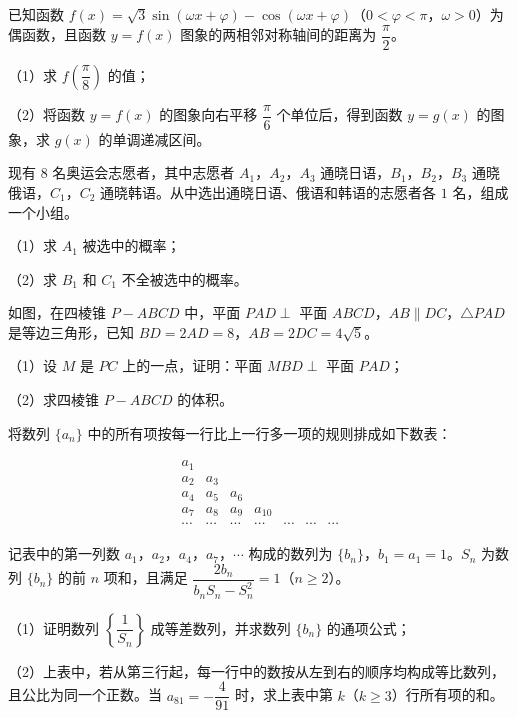 \begin{question}
已知函数 $f(x)=\sqrt3\sin(\omega x+\varphi)-\cos(\omega x+\varphi)$（$0<\varphi<\pi$，$\omega>0$）为偶函数，且函数 $y=f(x)$ 图象的两相邻对称轴间的距离为 $\dfrac{\pi}{2}$。

（1）求 $f\left(\dfrac{\pi}{8}\right)$ 的值；

（2）将函数 $y=f(x)$ 的图象向右平移 $\dfrac{\pi}{6}$ 个单位后，得到函数 $y=g(x)$ 的图象，求 $g(x)$ 的单调递减区间。

\end{question}
\begin{question}
现有 $8$ 名奥运会志愿者，其中志愿者 $A_1$，$A_2$，$A_3$ 通晓日语，$B_1$，$B_2$，$B_3$ 通晓俄语，$C_1$，$C_2$ 通晓韩语。从中选出通晓日语、俄语和韩语的志愿者各 $1$ 名，组成一个小组。

（1）求 $A_1$ 被选中的概率；

（2）求 $B_1$ 和 $C_1$ 不全被选中的概率。

\Needspace{0.4\textheight}
\end{question}
\begingroup
\renewenvironment{question}{\Needspace{0.45\textheight}}{}
\begin{question}
如图，在四棱锥 $P-ABCD$ 中，平面 $PAD\perp$ 平面 $ABCD$，$AB\parallel DC$，$\triangle PAD$ 是等边三角形，已知 $BD=2AD=8$，$AB=2DC=4\sqrt5$。

（1）设 $M$ 是 $PC$ 上的一点，证明：平面 $MBD\perp$ 平面 $PAD$；

（2）求四棱锥 $P-ABCD$ 的体积。
\nopagebreak[4]
\begin{center}\end{center}
\nopagebreak[4]
\end{question}
\endgroup
\begin{question}
将数列 $\{a_n\}$ 中的所有项按每一行比上一行多一项的规则排成如下数表：

\nopagebreak[4]
\[\begin{array}{ccccccc}
a_1&&&&&&\\
a_2&a_3&&&&&\\
a_4&a_5&a_6&&&&\\
a_7&a_8&a_9&a_{10}&&&\\
\cdots&\cdots&\cdots&\cdots&\cdots&\cdots&\cdots
\end{array}\]

记表中的第一列数 $a_1$，$a_2$，$a_4$，$a_7$，$\cdots$ 构成的数列为 $\{b_n\}$，$b_1=a_1=1$。$S_n$ 为数列 $\{b_n\}$ 的前 $n$ 项和，且满足 $\dfrac{2b_n}{b_nS_n-S_n^2}=1$（$n\geqslant2$）。

（1）证明数列 $\left\{\dfrac1{S_n}\right\}$ 成等差数列，并求数列 $\{b_n\}$ 的通项公式；

（2）上表中，若从第三行起，每一行中的数按从左到右的顺序均构成等比数列，且公比为同一个正数。当 $a_{81}=-\dfrac4{91}$ 时，求上表中第 $k$（$k\geqslant3$）行所有项的和。

\end{question}
